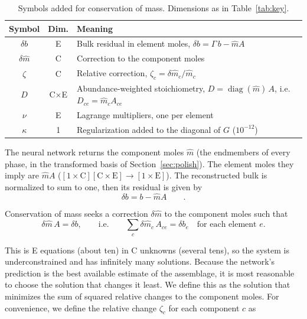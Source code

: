 \begin{table}[!htb]
\centering
\small
\renewcommand{\arraystretch}{1.25}
\begin{tabular}{@{}c c >{\raggedright\arraybackslash}p{11.6cm}@{}}
\toprule
Symbol & Dim. & Meaning \\
\midrule
$\delta b$ & E & Bulk residual in element moles, $\delta b = \Gamma\, b - \hat m A$ \\
$\delta \hat m$ & C & Correction to the component moles \\
$\zeta$ & C & Relative correction, $\zeta_c = \delta\hat m_c / \hat m_c$ \\
$D$ & C$\times$E & Abundance-weighted stoichiometry, $D = \operatorname{diag}(\hat m)\, A$,
  i.e.\ $D_{ce} = \hat m_c A_{ce}$ \\
$\nu$ & E & Lagrange multipliers, one per element \\
$\kappa$ & 1 & Regularization added to the diagonal of $G$ ($10^{-12}$) \\
\bottomrule
\end{tabular}
\caption{Symbols added for conservation of mass. Dimensions as in Table~\ref{tab:key}.}
\label{tab:mbkey}
\end{table}

The neural network returns the component moles $\hat m$ (the endmembers of every phase, in the
transformed basis of Section~\ref{sec:polish}). The element moles they imply are $\hat m A$
($[1\times\text{C}][\text{C}\times\text{E}] \to [1\times\text{E}]$). The reconstructed bulk is normalized to sum to one, then
its residual is given by
\begin{equation}
  \delta b = b - \hat m A 
  \qquad .
  \label{eq:mbr}
\end{equation}

Conservation of mass seeks a correction $\delta\hat m$ to the component moles such that
\begin{equation}
  \delta\hat m\, A = \delta b,
  \qquad\text{i.e.}\qquad
  \sum_c \delta\hat m_c\, A_{ce} = \delta b_e \quad \text{for each element } e .
  \label{eq:mbcond}
\end{equation}

This is E equations (about ten) in C unknowns (several tens), so the system is underconstrained and 
has infinitely many solutions. Because the network's prediction is the best available estimate of the assemblage, it is 
most reasonable to choose the solution that changes it least. We define this as the solution that minimizes the sum of 
squared relative changes to the component moles. For convenience, we define the relative change $\zeta_c$ for each component $c$ as

